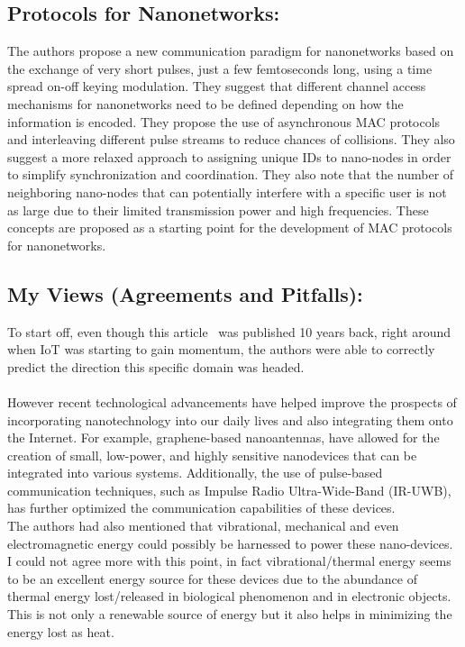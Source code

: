 \documentclass{report}
\begin{document}
\subsection*{Protocols for Nanonetworks:}

    The authors propose a new communication paradigm for nanonetworks based on the exchange of very short pulses, just a few femtoseconds long, using a time spread on-off keying modulation. They suggest that different channel access mechanisms for nanonetworks need to be defined depending on how the information is encoded. They propose the use of asynchronous MAC protocols and interleaving different pulse streams to reduce chances of collisions. They also suggest a more relaxed approach to assigning unique IDs to nano-nodes in order to simplify synchronization and coordination. They also note that the number of neighboring nano-nodes that can potentially interfere with a specific user is not as large due to their limited transmission power and high frequencies. These concepts are proposed as a starting point for the development of MAC protocols for nanonetworks.

\subsection*{My Views (Agreements and Pitfalls):}
    To start off, even though this article~\cite{5675779} was published 10 years back, right around when IoT was starting to gain momentum, the authors were able to correctly predict the direction this specific domain was headed.\\\\
    However recent technological advancements have helped improve the prospects of incorporating nanotechnology into our daily lives and also integrating them onto the Internet. For example, graphene-based nanoantennas, have allowed for the creation of small, low-power, and highly sensitive nanodevices that can be integrated into various systems. Additionally, the use of pulse-based communication techniques, such as Impulse Radio Ultra-Wide-Band (IR-UWB), has further optimized the communication capabilities of these devices.\\

    The authors had also mentioned that vibrational, mechanical and even electromagnetic energy could possibly be harnessed to power these nano-devices. I could not agree more with this point, in fact vibrational/thermal energy seems to be an excellent energy source for these devices due to the abundance of thermal energy lost/released in biological phenomenon and in electronic objects. This is not only a renewable source of energy but it also helps in minimizing the energy lost as heat.\\
\end{document}
